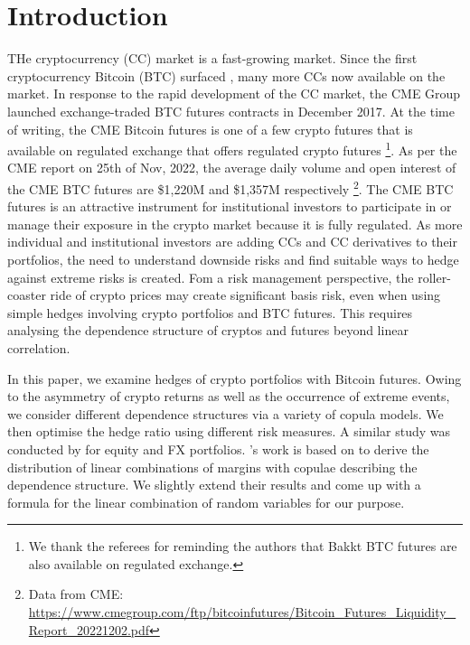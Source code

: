 \documentclass[11pt,a4paper,english]{article}
\begin{document}
\section{Introduction}\label{sec:introduction}
THe cryptocurrency (CC) market is a fast-growing market.
Since the first cryptocurrency Bitcoin (BTC) surfaced \citep{nakamoto2009}, 
many more CCs now available on the market.
In response to the rapid development of the CC market, the CME Group
launched exchange-traded BTC futures contracts in December
2017.
At the time of writing, the CME Bitcoin futures is one of a few crypto futures that is available on regulated exchange that offers
regulated crypto futures \footnote{We thank the referees for reminding the authors that Bakkt BTC futures are also available on regulated exchange.}. 
As per the CME report on 25th of Nov, 2022, the average daily volume and open interest of the CME BTC futures are
\$1,220M and \$1,357M respectively \footnote{Data from CME: \url{https://www.cmegroup.com/ftp/bitcoinfutures/Bitcoin_Futures_Liquidity_Report_20221202.pdf}}.
The CME BTC futures is an attractive instrument for institutional investors to participate in or manage their exposure in the crypto
market because it is fully regulated. 
As more individual and institutional investors are adding CCs and CC
derivatives to their portfolios, the need to understand
downside risks and find suitable ways to hedge against extreme risks
is created. 
Fom a risk management perspective, the roller-coaster ride
of crypto prices may create significant basis risk, even when using
simple hedges involving crypto portfolios and BTC futures. This
requires analysing the dependence structure of cryptos and
futures beyond linear correlation. 

In this paper, we examine hedges of crypto portfolios
with Bitcoin futures. Owing to the asymmetry of crypto returns as
well as the occurrence of extreme events, we consider different 
dependence structures via a variety of copula models. We then optimise
the hedge ratio using different risk measures. A similar study was
conducted by \citep{barbi2014copula} for equity and FX portfolios.
\citet{barbi2014copula}'s work is based on \citet{cherubini2011copula}
to derive the distribution of linear combinations of margins with
copulae describing the dependence structure. We slightly extend their
results and come up with a formula for the linear combination of
random variables for our purpose.
\end{document}
